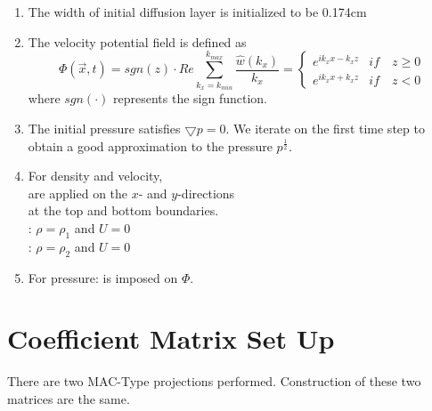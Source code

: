 \documentclass{article}
\numberwithin{equation}{subsection}
\begin{document}
\begin{enumerate}
\item The width of initial diffusion layer is initialized to be 0.174cm

\item The velocity potential field is defined as
\[
\Phi(\vec{x},t) = sgn(z) \cdot Re \sum_{k_x = k_{min}}^{k_{max}} \frac{\hat{w}(k_x)}{k_x} =
   \begin{cases} 
      e^{i k_x x - k_x z}  & if \quad z \geq 0 \\
      e^{i k_x x + k_x z}  & if \quad z < 0
   \end{cases}
\]
where $sgn(\cdot)$ represents the sign function.

\item The initial pressure satisfies $\bigtriangledown p = 0$. We iterate on the first time step to obtain a good approximation to the pressure $p^{\frac{1}{2}}$.

\item For density and velocity, \\
 are applied on the $x$- and $y$-directions \\
 at the top and bottom boundaries.\\
: $\rho = \rho_1$ and $U = 0$ \\ 
: $\rho = \rho_2$ and $U = 0$

\item For pressure:  is imposed on $\Phi$.

\end{enumerate}




\section{Coefficient Matrix Set Up}




There are two MAC-Type projections performed. Construction of these two matrices are the same.
\end{document}
